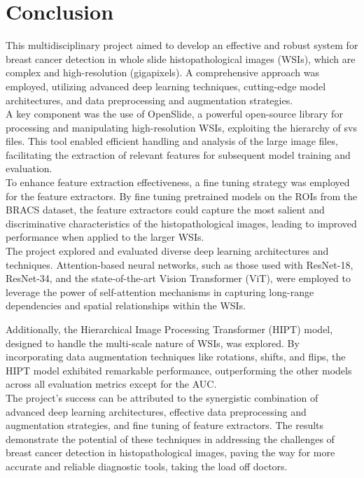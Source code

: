 \documentclass[
11pt, %
english, %
singlespacing, %
headsepline, %
]{project_structure}
\begin{document}
\newpage
\section{Conclusion}
\noindent This multidisciplinary project aimed to develop an effective and robust system for breast cancer detection in whole slide histopathological images (WSIs), which are complex and high-resolution (gigapixels). A comprehensive approach was employed, utilizing advanced deep learning techniques, cutting-edge model architectures, and data preprocessing and augmentation strategies.\\

\noindent A key component was the use of OpenSlide, a powerful open-source library for processing and manipulating high-resolution WSIs, exploiting the hierarchy of svs files. This tool enabled efficient handling and analysis of the large image files, facilitating the extraction of relevant features for subsequent model training and evaluation.\\

\noindent To enhance feature extraction effectiveness, a fine tuning strategy was employed for the feature extractors. By fine tuning pretrained models on the ROIs from the BRACS dataset, the feature extractors could capture the most salient and discriminative characteristics of the histopathological images, leading to improved performance when applied to the larger WSIs.\\

\noindent The project explored and evaluated diverse deep learning architectures and techniques. Attention-based neural networks, such as those used with ResNet-18, ResNet-34, and the state-of-the-art Vision Transformer (ViT), were employed to leverage the power of self-attention mechanisms in capturing long-range dependencies and spatial relationships within the WSIs.

\noindent Additionally, the Hierarchical Image Processing Transformer (HIPT) model, designed to handle the multi-scale nature of WSIs, was explored. By incorporating data augmentation techniques like rotations, shifts, and flips, the HIPT model exhibited remarkable performance, outperforming the other models across all evaluation metrics except for the AUC.\\

\noindent The project's success can be attributed to the synergistic combination of advanced deep learning architectures, effective data preprocessing and augmentation strategies, and fine tuning of feature extractors. The results demonstrate the potential of these techniques in addressing the challenges of breast cancer detection in histopathological images, paving the way for more accurate and reliable diagnostic tools, taking the load off doctors.\\
\end{document}
